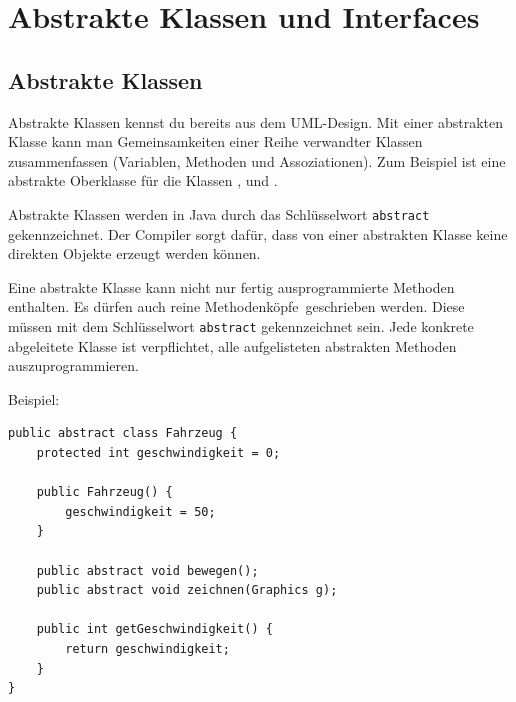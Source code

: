 \chapter{Abstrakte Klassen und Interfaces \tagZusatz}
\renewcommand{\chaptertitle}{Abstrakte Klassen und Interfaces}

\lehead[]{\normalfont\sffamily\hspace*{-2.00cm}\textcolor{white}{\colorbox{lightblue}{\makebox[1.60cm][r]{\thechapter}}}\hspace{0.17cm}\textcolor{lightblue}{\chaptertitle}}
\rohead[]{\textcolor{lightblue}{\chaptertitle}\normalfont\sffamily\hspace*{0.17cm}\textcolor{white}{\colorbox{lightblue}{\makebox[1.60cm][l]{\thechapter}}}\hspace{-2.00cm}}
\rehead[]{\textcolor{lightblue}{AvHG, Inf, My}}
\lohead[]{\textcolor{lightblue}{AvHG, Inf, My}}

\lstset{style=myJava}

\section{Abstrakte Klassen}

Abstrakte Klassen kennst du bereits aus dem UML-Design. Mit einer abstrakten
Klasse kann man Gemeinsamkeiten einer Reihe verwandter Klassen zusammenfassen
(Variablen, Methoden und Assoziationen). Zum Beispiel ist 
eine abstrakte Oberklasse für die Klassen , 
und .

Abstrakte Klassen werden in Java durch das Schlüsselwort \lstinline|abstract|
gekennzeichnet. Der Compiler sorgt dafür, dass von einer abstrakten Klasse
keine direkten Objekte erzeugt werden können.

Eine abstrakte Klasse kann nicht nur fertig ausprogrammierte Methoden
enthalten. Es dürfen auch reine \glqq Methodenköpfe\grqq\ geschrieben werden.
Diese müssen mit dem Schlüsselwort \lstinline|abstract| gekennzeichnet sein.
Jede konkrete abgeleitete Klasse ist verpflichtet, alle aufgelisteten
abstrakten Methoden auszuprogrammieren.

Beispiel:

\begin{lstlisting}
public abstract class Fahrzeug {
    protected int geschwindigkeit = 0;

    public Fahrzeug() {
        geschwindigkeit = 50;
    }

    public abstract void bewegen();
    public abstract void zeichnen(Graphics g);
    
    public int getGeschwindigkeit() {
        return geschwindigkeit;
    }
}
\end{lstlisting}


